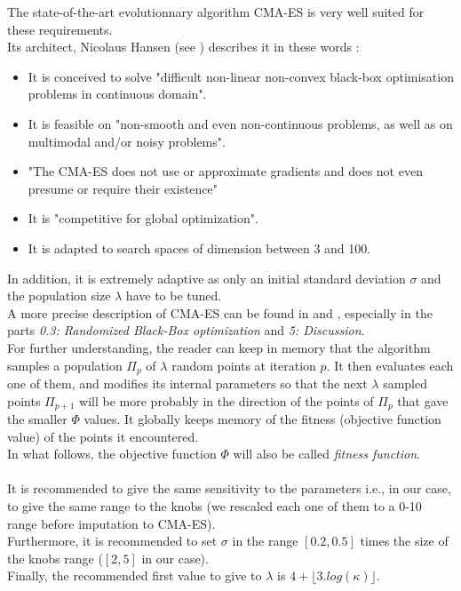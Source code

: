 The state-of-the-art evolutionnary algorithm CMA-ES is very well suited for these requirements.\\
Its architect, Nicolaus Hansen (see \cite{cmaintro}) describes it in these words :
\begin{itemize}
	\item It is conceived to solve "difficult non-linear non-convex black-box optimisation problems in continuous domain". 
	\item It is feasible on "non-smooth and even non-continuous problems, as well as on multimodal and/or noisy problems".
	\item "The CMA-ES does not use or approximate gradients and does not even presume or require their existence"
	\item It is "competitive for global optimization".
	\item It is adapted to search spaces of dimension between 3 and 100.
\end{itemize}
In addition, it is extremely adaptive as only an initial standard deviation $\sigma$ and the population size $\lambda$ have to be tuned.\\
A more precise description of CMA-ES can be found in \cite{cmaes} and \cite{cmatuto}, especially in the parts \emph{0.3: Randomized Black-Box optimization} and \emph{5: Discussion}.\\
For further understanding, the reader can keep in memory that the algorithm samples a population $\Pi_{p}$ of $\lambda$ random points at iteration $p$. It then evaluates each one of them, and modifies its internal parameters so that the next $\lambda$ sampled points $\Pi_{p+1}$ will be more probably in the direction of the points of $\Pi_{p}$ that gave the smaller $\Phi$ values. It globally keeps memory of the fitness (objective function value) of the points it encountered.\\
In what follows, the objective function $\Phi$ will also be called \emph{fitness function}.\\
\\
It is recommended to give the same sensitivity to the parameters i.e., in our case, to give the same range to the knobs (we rescaled each one of them to a 0-10 range before imputation to CMA-ES).\\
Furthermore, it is recommended to set $\sigma$ in the range $[0.2,0.5]$ times the size of the knobs range ($[2,5]$ in our case).\\
Finally, the recommended first value to give to $\lambda$ is $4+\lfloor3.log(\kappa)\rfloor$.

